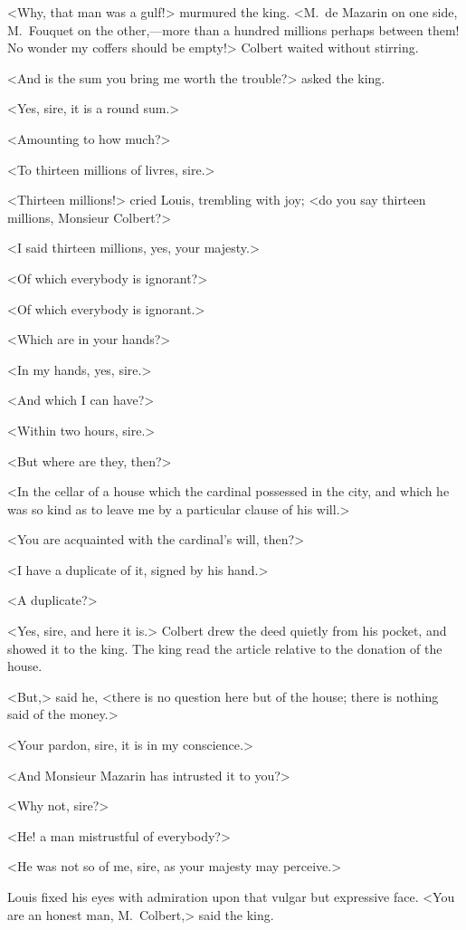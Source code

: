 <Why, that man was a gulf!> murmured the king. <M.~de Mazarin on one side, M.~Fouquet on the other,—more than a hundred millions perhaps between them! No wonder my coffers should be empty!> Colbert waited without stirring.

<And is the sum you bring me worth the trouble?> asked the king.

<Yes, sire, it is a round sum.>

<Amounting to how much?>

<To thirteen millions of livres, sire.>

<Thirteen millions!> cried Louis, trembling with joy; <do you say thirteen millions, Monsieur Colbert?>

<I said thirteen millions, yes, your majesty.>

<Of which everybody is ignorant?>

<Of which everybody is ignorant.>

<Which are in your hands?>

<In my hands, yes, sire.>

<And which I can have?>

<Within two hours, sire.>

<But where are they, then?>

<In the cellar of a house which the cardinal possessed in the city, and which he was so kind as to leave me by a particular clause of his will.>

<You are acquainted with the cardinal's will, then?>

<I have a duplicate of it, signed by his hand.>

<A duplicate?>

<Yes, sire, and here it is.> Colbert drew the deed quietly from his pocket, and showed it to the king. The king read the article relative to the donation of the house.

<But,> said he, <there is no question here but of the house; there is nothing said of the money.>

<Your pardon, sire, it is in my conscience.>

<And Monsieur Mazarin has intrusted it to you?>

<Why not, sire?>

<He! a man mistrustful of everybody?>

<He was not so of me, sire, as your majesty may perceive.>

Louis fixed his eyes with admiration upon that vulgar but expressive face. <You are an honest man, M.~Colbert,> said the king.

